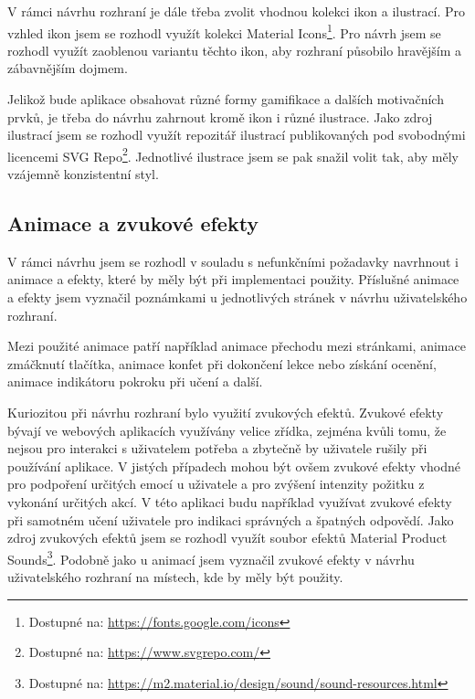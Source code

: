 V rámci návrhu rozhraní je dále třeba zvolit vhodnou kolekci ikon a ilustrací. Pro vzhled ikon jsem se rozhodl využít kolekci Material Icons\footnote{Dostupné na: \href{https://fonts.google.com/icons}{https://fonts.google.com/icons}}. Pro návrh jsem se rozhodl využít zaoblenou variantu těchto ikon, aby rozhraní působilo hravějším a zábavnějším dojmem.

Jelikož bude aplikace obsahovat různé formy gamifikace a dalších motivačních prvků, je třeba do návrhu zahrnout kromě ikon i různé ilustrace. Jako zdroj ilustrací jsem se rozhodl využít repozitář ilustrací publikovaných pod svobodnými licencemi SVG Repo\footnote{Dostupné na: \href{https://www.svgrepo.com/}{https://www.svgrepo.com/}}. Jednotlivé ilustrace jsem se pak snažil volit tak, aby měly vzájemně konzistentní styl.

\subsection{Animace a zvukové efekty}

V rámci návrhu jsem se rozhodl v souladu s nefunkčními požadavky navrhnout i animace a efekty, které by měly být při implementaci použity. Příslušné animace a efekty jsem vyznačil poznámkami u jednotlivých stránek v návrhu uživatelského rozhraní.

Mezi použité animace patří například animace přechodu mezi stránkami, animace zmáčknutí tlačítka, animace konfet při dokončení lekce nebo získání ocenění, animace indikátoru pokroku při učení a další.

Kuriozitou při návrhu rozhraní bylo využití zvukových efektů. Zvukové efekty bývají ve webových aplikacích využívány velice zřídka, zejména kvůli tomu, že nejsou pro interakci s uživatelem potřeba a zbytečně by uživatele rušily při používání aplikace. V jistých případech mohou být ovšem zvukové efekty vhodné pro podpoření určitých emocí u uživatele a pro zvýšení intenzity požitku z vykonání určitých akcí. V této aplikaci budu například využívat zvukové efekty při samotném učení uživatele pro indikaci správných a špatných odpovědí. Jako zdroj zvukových efektů jsem se rozhodl využít soubor efektů Material Product Sounds\footnote{Dostupné na: \href{https://m2.material.io/design/sound/sound-resources.html}{https://m2.material.io/design/sound/sound-resources.html}}. Podobně jako u animací jsem vyznačil zvukové efekty v návrhu uživatelského rozhraní na místech, kde by měly být použity. \cite {MaterialDesign2ApplyingSounds}

